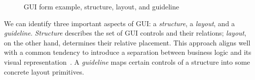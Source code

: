 \begin{figure}[t]
{  }
\vskip5mm

\caption{GUI form example, structure, layout, and guideline}
\label{form1-structure-layout}
\end{figure}

We can identify three important aspects of GUI: a \emph{structure}, a \emph{layout}, and a \emph{guideline}.
\emph{Structure} describes the set of GUI controls and their relations; \emph{layout}, on the other hand, determines
their relative placement. This approach aligns well with a common tendency to introduce a separation between business
logic and its visual representation~\cite{UI3}. A \emph{guideline} maps certain controls of a structure into some concrete
layout primitives.

